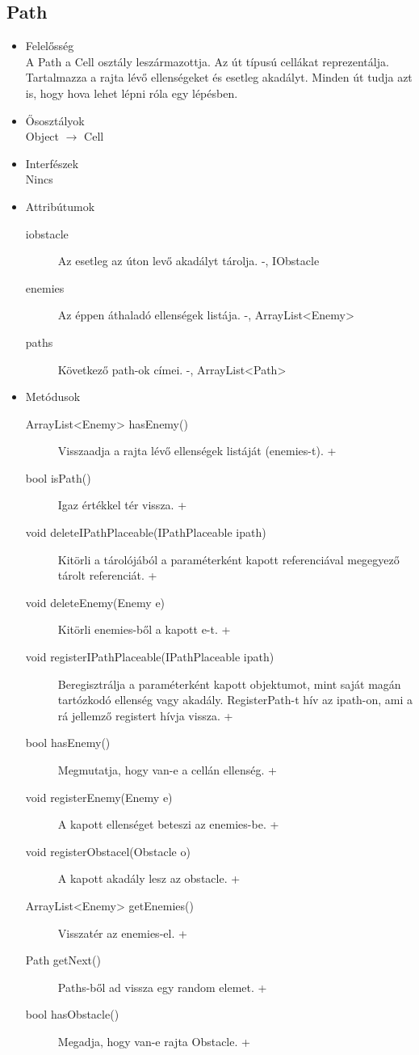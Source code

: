 \subsection{Path}
\begin{itemize}
\item Felelősség\\
A Path a Cell osztály leszármazottja. Az út típusú cellákat reprezentálja. Tartalmazza a rajta lévő ellenségeket és esetleg akadályt. Minden út tudja azt is, hogy hova lehet lépni róla egy lépésben.
\item Ősosztályok\\
Object $\rightarrow$ Cell
\item Interfészek\\
Nincs
\item Attribútumok\\
	\begin{description}
		\item[iobstacle] Az esetleg az úton levő akadályt tárolja. -, IObstacle 
		\item[enemies] Az éppen áthaladó ellenségek listája. -, ArrayList<Enemy> 
		\item[paths] Következő path-ok címei. -, ArrayList<Path> 

		
	\end{description}
\item Metódusok\\
	\begin{description}
		\item[ArrayList<Enemy> hasEnemy()] Visszaadja a rajta lévő ellenségek listáját (enemies-t). +
		\item[bool isPath()] Igaz értékkel tér vissza. +
		\item[void deleteIPathPlaceable(IPathPlaceable ipath)] Kitörli a tárolójából a paraméterként kapott referenciával megegyező tárolt referenciát. +
		\item[void deleteEnemy(Enemy e)] Kitörli enemies-ből a kapott e-t. +
		\item[void registerIPathPlaceable(IPathPlaceable ipath)] Beregisztrálja a paraméterként kapott objektumot, mint saját magán tartózkodó ellenség vagy akadály. RegisterPath-t hív az ipath-on, ami a rá jellemző registert hívja vissza. +
		\item[bool hasEnemy()] Megmutatja, hogy van-e a cellán ellenség. +
		\item[void registerEnemy(Enemy e)] A kapott ellenséget beteszi az enemies-be. +
		\item[void registerObstacel(Obstacle o)] A kapott akadály lesz az obstacle. +
		\item[ArrayList<Enemy> getEnemies()] Visszatér az enemies-el. +
		\item[Path getNext()] Paths-ből ad vissza egy random elemet. +
		\item[bool hasObstacle()] Megadja, hogy van-e rajta Obstacle. +
		
		
	\end{description}
\end{itemize}

